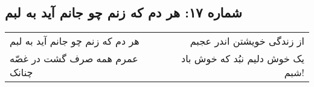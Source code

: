 \begin{center}
\section*{شماره ۱۷: هر دم که زنم چو جانم آید به لبم}
\label{sec:017}
\begin{longtable}{l p{0.5cm} r}
هر دم که زنم چو جانم آید به لبم
&&
از زندگی خویشتن اندر عجبم
\\
عمرم همه صرف گشت در غصّه چنانک
&&
یک خوش دلیم نبُد که خوش باد شبم!
\\
\end{longtable}
\end{center}
